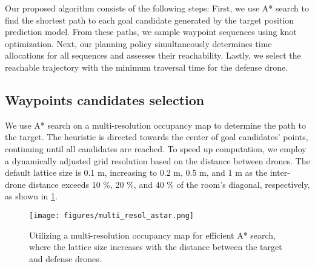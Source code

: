 Our proposed algorithm consists of the following steps:
First, we use A* search to find the shortest path to each goal candidate generated by the target position prediction model. 
From these paths, we sample waypoint sequences using knot optimization. 
Next, our planning policy simultaneously determines time allocations for all sequences and assesses their reachability. 
Lastly, we select the reachable trajectory with the minimum traversal time for the defense drone.

\subsection{Waypoints candidates selection}

We use A* search on a multi-resolution occupancy map to determine the path to the target. 
The heuristic is directed towards the center of goal candidates' points, continuing until all candidates are reached. 
To speed up computation, we employ a dynamically adjusted grid resolution based on the distance between drones. 
The default lattice size is 0.1 m, increasing to 0.2 m, 0.5 m, and 1 m as the inter-drone distance exceeds 10 \%, 20 \%, and 40 \% of the room's diagonal, respectively, as shown in \cref{fig:multi_resol_astar}.

\begin{figure}[]
    \centering
    \texttt{[image: figures/multi\_resol\_astar.png]}
    \caption{Utilizing a multi-resolution occupancy map for efficient A* search, where the lattice size increases with the distance between the target and defense drones.}
    \label{fig:multi_resol_astar}
    \vspace{-2.0\baselineskip}
\end{figure}

